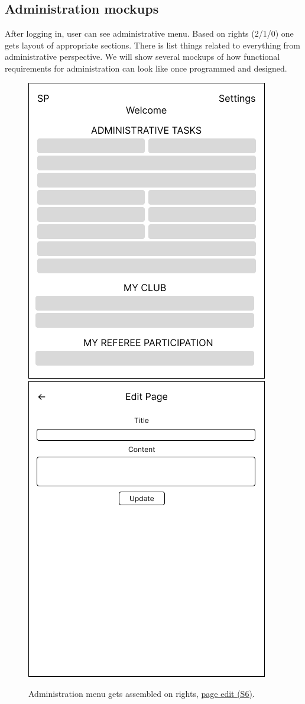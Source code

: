 \subsection*{Administration mockups}
After logging in, user can see administrative menu. Based on rights (2/1/0) one gets layout of  appropriate sections. There is list things related to everything from administrative perspective. We will show several mockups of how functional requirements for administration can look like once programmed and designed. 
\begin{figure}[h]	
	\centering	
\includegraphics[scale=0.457]{img/A-administrace.png}
\includegraphics[scale=0.457]{img/A-edit-page.png}
\caption{Administration menu gets assembled on rights, \underline{page edit (S6)}.}
\label{fig2.4:feprivatepages1}
\end{figure}
